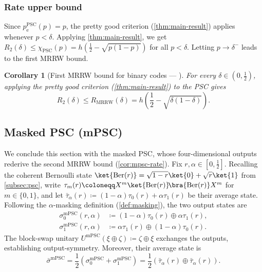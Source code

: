 \documentclass[11pt]{article}
\renewcommand{\leq}{\leqslant}
\newtheorem{corollary}[corollary]{Corollary}
\theoremstyle{remark}
\newcommand{\ketbra}[2]{\ket{#1}\!\bra{#2}}
\newcommand{\Ber}{\operatorname{Ber}}
\newcommand{\bits}{\{0,1\}}
\newcommand{\MRRW}{R_{\mathrm{MRRW}}}
\newcommand{\PSC}{\mathrm{PSC}}
\newcommand{\mPSC}{\mathrm{mPSC}}
\begin{document}
\subsubsection{Rate upper bound}
\label{subsubsec:psc-rate}

Since $p_{\mathrm{e}}^{\PSC}(p) = p$, the pretty good criterion (\cref{thm:main-result}) applies whenever $p < \delta$. Applying \cref{thm:main-result}, we get $R_2(\delta) \leq \chi_{\PSC}(p) = h\left(\frac{1}{2}-\sqrt{p(1-p)}\right)$ for all $p < \delta$. Letting $p \to \delta^-$ leads to the first MRRW bound.

\begin{corollary}[{First MRRW bound for binary codes --- \cite[Equation~(1.5)]{MRRW77}}]
\label{cor:psc-rate}
For every $\delta \in (0,\frac{1}{2})$, applying the pretty good criterion (\cref{thm:main-result}) to the PSC gives
\begin{equation*}
R_2(\delta) \leq \MRRW(\delta)
= h\left(\frac{1}{2}-\sqrt{\delta(1-\delta)}\right).
\end{equation*}
\end{corollary}

\subsection{Masked PSC (mPSC)}
\label{subsec:mpsc}

We conclude this section with the masked PSC, whose four-dimensional outputs rederive the second MRRW bound (\cref{cor:mpsc-rate}). Fix $r,\alpha \in [0,\frac{1}{2}]$. Recalling the coherent Bernoulli state $\ket{\Ber(r)} = \sqrt{1-r}\ket{0}+\sqrt{r}\ket{1}$ from \cref{subsec:psc}, write $\tau_m(r) \coloneqq X^m\ketbra{\Ber(r)}{\Ber(r)}X^m$ for $m \in \bits$, and let $\bar{\tau}_\alpha(r) \coloneqq (1-\alpha)\tau_0(r)+\alpha\tau_1(r)$ be their average state. Following the $\alpha$-masking definition (\cref{def:masking}), the two output states are
\begin{align*}
\sigma_0^{\mPSC}(r,\alpha) &\coloneqq (1-\alpha)\tau_0(r) \oplus \alpha\tau_1(r), \\
\sigma_1^{\mPSC}(r,\alpha) &\coloneqq \alpha\tau_1(r) \oplus (1-\alpha)\tau_0(r).
\end{align*}
The block-swap unitary $U^{\mPSC}(\xi \oplus \zeta) \coloneqq \zeta \oplus \xi$ exchanges the outputs, establishing output-symmetry. Moreover, their average state is
\begin{equation*}
\bar{\sigma}^{\mPSC}
=\frac{1}{2}\left(\sigma_0^{\mPSC}+\sigma_1^{\mPSC}\right)
=\frac{1}{2}\left(\bar{\tau}_\alpha(r) \oplus \bar{\tau}_\alpha(r)\right).
\end{equation*}
\end{document}

